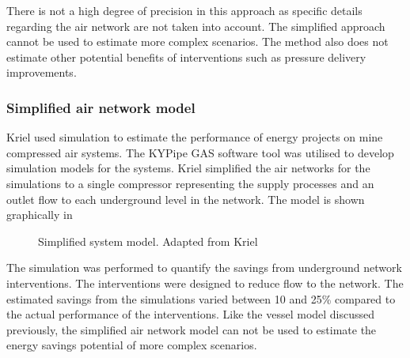 		There is not a high degree of precision in this approach as specific details regarding the air network are not taken into account. The simplified approach cannot be used to estimate more complex scenarios. The method also does not estimate other potential benefits of interventions such as pressure delivery improvements.
		
		\subsubsection{Simplified air network model}
		Kriel \cite{Kriel2014Masters} used simulation to estimate the performance of energy projects on mine compressed air systems. The KYPipe GAS software tool was utilised to develop simulation models for the systems. Kriel simplified the air networks for the simulations to a single compressor representing the supply processes and an outlet flow to each underground level in the network. The model is shown graphically in 
		\begin{figure}[h!]
			\centering
			\caption[Simplified system model]{Simplified system model. Adapted from Kriel \cite{Kriel2014Masters}}
			\label{fig:kriel model}
		\end{figure}
		\par 
		The simulation was performed to quantify the savings from underground network interventions. The interventions were designed to reduce flow to the network. The estimated savings from the simulations varied between 10 and 25\% compared to the actual performance of the interventions. Like the vessel model discussed previously, the simplified air network model can not be used to estimate the energy savings potential of more complex scenarios.

